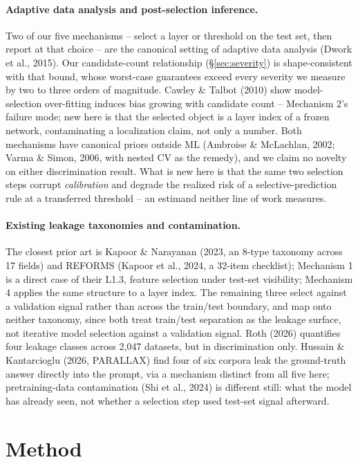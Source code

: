 \documentclass{article}
\begin{document}
\paragraph{Adaptive data analysis and post-selection inference.} Two of our
five mechanisms -- select a layer or threshold on the test set, then report at
that choice -- are the canonical setting of adaptive data analysis (Dwork
et al., 2015). Our candidate-count relationship (\S\ref{sec:severity}) is
shape-consistent with that bound, whose worst-case guarantees exceed every
severity we measure by two to three orders of magnitude. Cawley \& Talbot (2010) show
model-selection over-fitting induces bias growing with candidate count --
Mechanism 2's failure mode; new here is that the selected object is a layer
index of a frozen network, contaminating a localization claim, not only a
number. Both mechanisms have canonical priors outside ML (Ambroise \&
McLachlan, 2002; Varma \& Simon, 2006, with nested CV as the remedy), and we
claim no novelty on either discrimination result. What is new here is that the
same two selection steps corrupt \emph{calibration} and degrade the realized
risk of a selective-prediction rule at a transferred threshold -- an estimand
neither line of work measures.

\paragraph{Existing leakage taxonomies and contamination.} The closest
prior art is Kapoor \& Narayanan (2023, an 8-type taxonomy across 17
fields) and REFORMS (Kapoor et al., 2024, a 32-item checklist); Mechanism 1 is a direct case of
their L1.3, feature selection under test-set visibility; Mechanism 4 applies
the same structure to a layer index. The remaining three select against a
validation signal rather than across the train/test boundary, and map onto
neither taxonomy, since both
treat train/test separation as the leakage surface, not iterative model
selection against a validation signal. Roth (2026) quantifies four leakage
classes across 2,047 datasets, but in discrimination only. Hussain \& Kantarcioglu (2026, PARALLAX) find
four of six corpora leak the ground-truth answer directly into the prompt,
via a mechanism distinct from all five here; pretraining-data contamination
(Shi et al., 2024) is different still: what the model has already seen,
not whether a selection step used test-set signal afterward.

\section{Method}
\label{sec:method}
\end{document}
